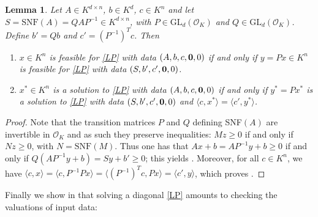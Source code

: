 \documentclass[a4paper,oneside,10pt]{article}
\newtheorem{lemma}[theorem]{Lemma}
\newcommand{\OK}{\mathcal{O}_K}
\newcommand{\GL}{\mathrm{GL}}
\begin{document}
\begin{lemma} \label{solsLP}
  Let $A \in K^{d\times n}$, $b \in K^d$, $c\in K^n$ and let
  $S = \mathrm{SNF}(A) = QAP^{-1} \in K^{d\times n}$, with
  $P \in \GL_d(\OK)$ and $Q\in \GL_d(\OK)$.
  Define $b' = Qb$ and $c' = (P^{-1})^Tc$.
  Then
   \begin{enumerate}
   \item \label{solsLP_item1}
     $x \in K^n$ is feasible for \eqref{LP} with data $(A,b,c,{\bf 0},0)$ if and only if $y = P x \in K^n$ is
     feasible for \eqref{LP} with data $(S,b',c',{\bf 0},0)$.
   \item \label{solsLP_item2}
     $x^* \in K^n$ is a solution to \eqref{LP} with data $(A,b,c,{\bf 0},0)$ if and only if $y^* = P x^*$ is
     a solution to \eqref{LP} with data $(S,b',c',{\bf 0},0)$ and $\langle c,x^* \rangle = \langle c',y^* \rangle$.
   \end{enumerate}
\end{lemma}
\begin{proof}
  Note that the transition matrices $P$ and $Q$ defining SNF$(A)$ are invertible in $\OK$
  and as such they preserve inequalities: $Mz \geq 0$ if and only if $Nz \geq 0$, with
  $N = \mathrm{SNF}(M)$. Thus one has that $Ax+b = AP^{-1}y +b \geq 0$ if and only if
  $Q(AP^{-1}y + b) = Sy + b' \geq 0$; this yields .
  Moreover, for all $c \in K^n$, we have $\langle c, x\rangle = \langle c, P^{-1}Px \rangle =
  \langle (P^{-1})^T c, Px \rangle = \langle c',y\rangle$, which proves
  .
\end{proof}

Finally we show in  that solving a diagonal \eqref{LP} amounts
to checking the valuations of input data:
\end{document}
